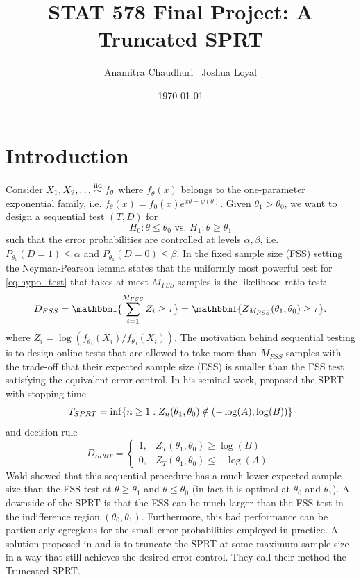 \documentclass[11pt]{article}
\begin{document}
\title{  {\LARGE STAT 578 Final Project: A Truncated SPRT} }

\author{
    Anamitra Chaudhuri \,
    Joshua Loyal
}

\date{\today}
\maketitle

\section{Introduction}
Consider $X_1, X_2, \dots \overset{\text{iid}}\sim f_{\theta}$ where $f_{\theta}(x)$ belongs to the one-parameter exponential family, i.e. $f_{\theta}(x) = f_0(x)e^{x\theta - \psi(\theta)}$. Given $\theta_1 > \theta_0$, we want to design a sequential test $(T, D)$ for
\begin{equation}\label{eq:hypo_test}
H_0: \theta \leq \theta_0 \text{ vs. } H_1: \theta \geq \theta_1
\end{equation}
such that the error probabilities are controlled at levels $\alpha, \beta$, i.e. $P_{\theta_0}(D = 1) \leq \alpha$ and $P_{\theta_1}(D = 0) \leq \beta$. In the fixed sample size (FSS) setting the Neyman-Pearson lemma states that the uniformly most powerful test for \ref{eq:hypo_test} that takes at most $M_{FSS}$ samples is the likelihood ratio test:
\begin{equation}
D_{FSS} = \ind{\sum_{i=1}^{M_{FSS}} Z_i \geq \tau}  = \ind{Z_{M_{FSS}}(\theta_1, \theta_0) \geq \tau}.
\end{equation}
where $Z_i = \log(f_{\theta_1}(X_i) / f_{\theta_0}(X_i))$. The motivation behind sequential testing is to design online tests that are allowed to take more than  $M_{FSS}$ samples with the trade-off that their expected sample size (ESS) is smaller than the FSS test satisfying the equivalent error control. In his seminal work, \citet{wald1947} proposed the SPRT with stopping time
\begin{equation}
T_{SPRT} = \inf\{n \geq 1 : Z_n(\theta_1, \theta_0) \notin (-\log(A), \log(B))\}
\end{equation}
and decision rule
\begin{equation}
D_{SPRT} =
\begin{cases}
1, & Z_T(\theta_1, \theta_0) \geq \log(B) \\
0, & Z_T(\theta_1, \theta_0) \leq -\log(A).
\end{cases}
\end{equation}
Wald showed that this sequential procedure has a much lower expected sample size than the FSS test at $\theta \geq \theta_1$ and $\theta \leq \theta_0$ (in fact it is optimal at $\theta_0$ and $\theta_1$). A downside of the SPRT is that the ESS can be much larger than the FSS test in the indifference region $(\theta_0, \theta_1)$. Furthermore, this bad performance can be particularly egregious for the small error probabilities employed in practice. A solution proposed in \citet{tantara1977} and \citet{tantara1982} is to truncate the SPRT at some maximum sample size in a way that still achieves the desired error control. They call their method the Truncated SPRT.
\end{document}
